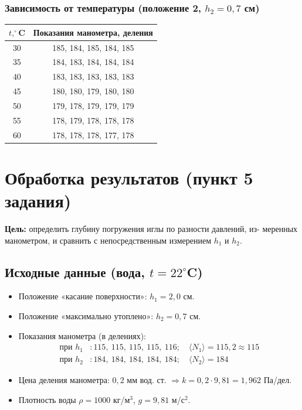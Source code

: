 \documentclass[a4paper, 12pt]{article}
\begin{document}
\subsubsection*{Зависимость от температуры (положение 2, $h_2 = 0{,}7$ см)}
\begin{center}
\begin{tabular}{c|c}
\toprule
$t, ^\circ$C & Показания манометра, деления \\
\midrule
30 & 185, 184, 185, 184, 185 \\
35 & 184, 183, 184, 184, 184 \\
40 & 183, 183, 183, 183, 183 \\
45 & 180, 180, 179, 180, 180 \\
50 & 179, 178, 179, 179, 179 \\
55 & 178, 179, 178, 178, 178 \\
60 & 178, 178, 178, 177, 178 \\
\bottomrule
\end{tabular}
\end{center}




\section*{Обработка результатов (пункт 5 задания)}

\textbf{Цель:} определить глубину погружения иглы по разности давлений, из-
меренных манометром, и сравнить с непосредственным измерением \(h_1\) и \(h_2\).

\subsection*{Исходные данные (вода, \(t = 22^\circ\)C)}

\begin{itemize}
    \item Положение «касание поверхности»: \(h_1 = 2,0\) см.
    \item Положение «максимально утоплено»: \(h_2 = 0,7\) см.
    \item Показания манометра (в делениях):
    \begin{align*}
        \text{при } h_1 &: 115,\ 115,\ 115,\ 115,\ 116; \quad \langle N_1 \rangle = 115{,}2 \approx 115 \\
        \text{при } h_2 &: 184,\ 184,\ 184,\ 184,\ 184; \quad \langle N_2 \rangle = 184
    \end{align*}
    \item Цена деления манометра: \(0,2\) мм вод. ст. \(\Rightarrow k = 0,2 \cdot 9,81 = 1,962\) Па/дел.
    \item Плотность воды \(\rho = 1000\) кг/м\(^3\), \(g = 9,81\) м/с\(^2\).
\end{itemize}
\end{document}
